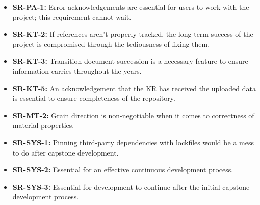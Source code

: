 \documentclass{article}
\begin{document}
\begin{itemize}
    \item \textbf{SR-PA-1:} Error acknowledgements are essential for users to work with the project; this requirement cannot wait.
    \item \textbf{SR-KT-2:} If references aren't properly tracked, the long-term success of the project is compromised through the tediousness of fixing them.
    \item \textbf{SR-KT-3:} Transition document succession is a necessary feature to ensure information carries throughout the years.
    \item \textbf{SR-KT-5:} An acknowledgement that the KR has received the uploaded data is essential to ensure completeness of the repository.
    \item \textbf{SR-MT-2:} Grain direction is non-negotiable when it comes to correctness of material properties.
    \item \textbf{SR-SYS-1:} Pinning third-party dependencies with lockfiles would be a mess to do after capstone development.
    \item \textbf{SR-SYS-2:} Essential for an effective continuous development process.
    \item \textbf{SR-SYS-3:} Essential for development to continue after the initial capstone development process.
\end{itemize}
\end{document}
